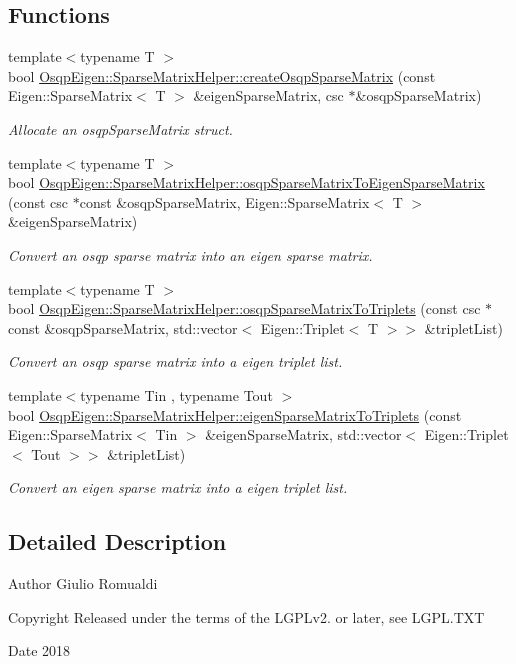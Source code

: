 \subsection*{Functions}
\begin{DoxyCompactItemize}
\item 
{\footnotesize template$<$typename T $>$ }\\bool \hyperlink{namespaceOsqpEigen_1_1SparseMatrixHelper_afd0b552419320e79e627e5d6c9e5715c}{Osqp\+Eigen\+::\+Sparse\+Matrix\+Helper\+::create\+Osqp\+Sparse\+Matrix} (const Eigen\+::\+Sparse\+Matrix$<$ T $>$ \&eigen\+Sparse\+Matrix, csc $\ast$\&osqp\+Sparse\+Matrix)
\begin{DoxyCompactList}\small\item\em Allocate an osqp\+Sparse\+Matrix struct. \end{DoxyCompactList}\item 
{\footnotesize template$<$typename T $>$ }\\bool \hyperlink{namespaceOsqpEigen_1_1SparseMatrixHelper_aec1a2210ce843eda8e4000c81d886131}{Osqp\+Eigen\+::\+Sparse\+Matrix\+Helper\+::osqp\+Sparse\+Matrix\+To\+Eigen\+Sparse\+Matrix} (const csc $\ast$const \&osqp\+Sparse\+Matrix, Eigen\+::\+Sparse\+Matrix$<$ T $>$ \&eigen\+Sparse\+Matrix)
\begin{DoxyCompactList}\small\item\em Convert an osqp sparse matrix into an eigen sparse matrix. \end{DoxyCompactList}\item 
{\footnotesize template$<$typename T $>$ }\\bool \hyperlink{namespaceOsqpEigen_1_1SparseMatrixHelper_af45a1d77519f691542150e506b6dcdeb}{Osqp\+Eigen\+::\+Sparse\+Matrix\+Helper\+::osqp\+Sparse\+Matrix\+To\+Triplets} (const csc $\ast$const \&osqp\+Sparse\+Matrix, std\+::vector$<$ Eigen\+::\+Triplet$<$ T $>$$>$ \&triplet\+List)
\begin{DoxyCompactList}\small\item\em Convert an osqp sparse matrix into a eigen triplet list. \end{DoxyCompactList}\item 
{\footnotesize template$<$typename Tin , typename Tout $>$ }\\bool \hyperlink{namespaceOsqpEigen_1_1SparseMatrixHelper_ad0dac7c63fc97d0ceddadd5145d9b5c6}{Osqp\+Eigen\+::\+Sparse\+Matrix\+Helper\+::eigen\+Sparse\+Matrix\+To\+Triplets} (const Eigen\+::\+Sparse\+Matrix$<$ Tin $>$ \&eigen\+Sparse\+Matrix, std\+::vector$<$ Eigen\+::\+Triplet$<$ Tout $>$$>$ \&triplet\+List)
\begin{DoxyCompactList}\small\item\em Convert an eigen sparse matrix into a eigen triplet list. \end{DoxyCompactList}\end{DoxyCompactItemize}


\subsection{Detailed Description}
\begin{DoxyAuthor}{Author}
Giulio Romualdi 
\end{DoxyAuthor}
\begin{DoxyCopyright}{Copyright}
Released under the terms of the L\+G\+P\+Lv2. or later, see L\+G\+P\+L.\+T\+XT 
\end{DoxyCopyright}
\begin{DoxyDate}{Date}
2018 
\end{DoxyDate}
